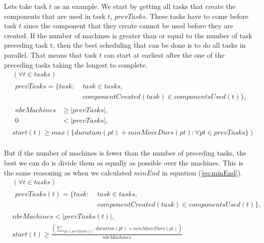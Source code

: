     Lets take task $t$ as an example. We start by getting all tasks that create the components that are used in task $t$, $prevTasks$. These tasks have to come before task $t$ since the component that they create cannot be used before they are created. If the number of machines is greater than or equal to the number of task preceding task t, then the best scheduling that can be done is to do all tasks in parallel. That means that task $t$ can start at earliest after the one of the preceding tasks taking the longest to complete.
  \begin{equation}
  \begin{aligned}\label{eq:70}
  &(\forall t \in tasks)\\
  &\begin{aligned}
  prevTasks = \{task : \; &task \in tasks,\\
  &componentCreated(task) \in componentsUsed(t)\},
  \end{aligned}\\
  &\begin{aligned}
  nbrMachines &\ge |prevTasks|,\\
  0 &< |prevTasks|,
  \end{aligned}\\
  &start(t) \ge max(\{duration(pt) + minMoveDurs(pt) : \forall pt \in prevTasks\}) \\
  \end{aligned}
  \end{equation}

   \noindent But if the number of machines is fewer than the number of preceding tasks, the best we can do is divide them as equally as possible over the machines. This is the same reasoning as when we calculated $minEnd$ in equation (\ref{eq:minEnd}).
  \begin{equation}
  \begin{aligned}\label{eq:71}
  &(\forall t \in tasks) \\
  &\begin{aligned}
  prevTasks(t) = \{task : \; & task \in tasks,\\
  &componentCreated(task) \in componentsUsed(t)\},
  \end{aligned} \\
  &nbrMachines < |prevTasks(t)|,  \\
  &start(t) \ge \frac{\left(\sum_{\forall pt \in prevTasks(t)}duration(pt) + minMoveDurs(pt)\right)}{nbrMachines}
  \end{aligned}
  \end{equation}

